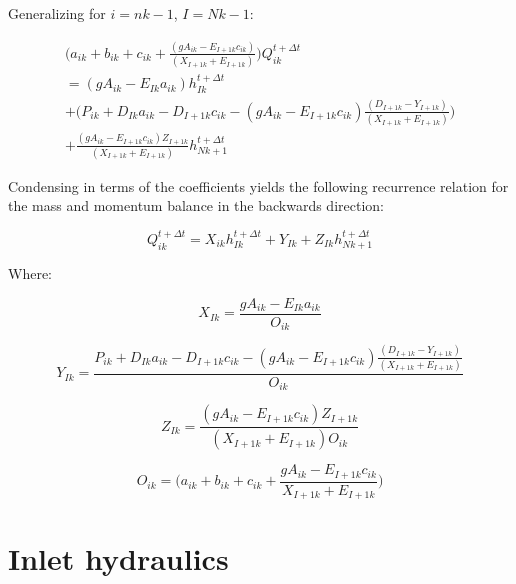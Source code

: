 \documentclass[11pt]{article}
\begin{document}
Generalizing for $i = nk - 1$, $I = Nk - 1$:

\begin{equation}
  \begin{split}
    \biggl(a_{ik} + b_{ik} + c_{ik} + \frac{( g A_{ik} - E_{I + 1k} c_{ik} )}{(X_{I + 1k} + E_{I + 1k})} \biggr)  Q_{ik}^{t + \Delta t} \\ = ( g A_{ik} - E_{Ik} a_{ik}) h_{Ik}^{t + \Delta t} \\ + \biggl( P_{ik} + D_{Ik} a_{ik}   - D_{I + 1k} c_{ik} - ( g A_{ik} - E_{I + 1k} c_{ik} ) \frac{( D_{I + 1k} - Y_{I + 1k})}{(X_{I + 1k} + E_{I + 1k})} \biggr) \\ + \frac{( g A_{ik} - E_{I + 1k} c_{ik} ) Z_{I + 1k}}{(X_{I + 1k} + E_{I + 1k})} h_{Nk + 1}^{t + \Delta t}
  \end{split}
\end{equation}

Condensing in terms of the coefficients yields the following recurrence relation for the mass
and momentum balance in the backwards direction: 

\begin{equation}
  \boxed{
 Q_{ik}^{t + \Delta t} = X_{ik} h_{Ik}^{t + \Delta t} + Y_{Ik} + Z_{Ik} h_{Nk + 1}^{t + \Delta t} 
 }
\end{equation}

Where:

\begin{equation}
  \boxed{
    X_{Ik} = \frac{ g A_{ik} - E_{Ik} a_{ik}}{O_{ik}}
 }
\end{equation}

\begin{equation}
  \boxed{
    Y_{Ik} = \frac{P_{ik} + D_{Ik} a_{ik}   - D_{I + 1k} c_{ik} - ( g A_{ik} - E_{I + 1k} c_{ik} ) \frac{( D_{I + 1k} - Y_{I + 1k})}{(X_{I + 1k} + E_{I + 1k})}}{O_{ik}}
 }
\end{equation}

\begin{equation}
  \boxed{
    Z_{Ik} = \frac{( g A_{ik} - E_{I + 1k} c_{ik} ) Z_{I + 1k}}{(X_{I + 1k} + E_{I + 1k}) O_{ik}}
 }
\end{equation}

\begin{equation}
  \boxed{
 O_{ik} = \biggl(a_{ik} + b_{ik} + c_{ik} + \frac{ g A_{ik} - E_{I + 1k} c_{ik} }{X_{I + 1k} + E_{I + 1k}} \biggr) 
 }
\end{equation}

\clearpage

\section{Inlet hydraulics}
\end{document}
